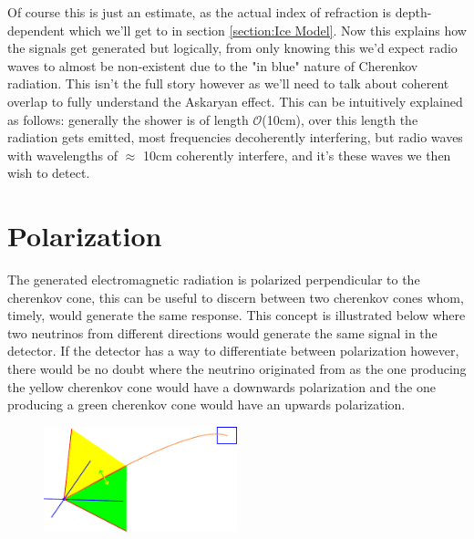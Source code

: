 \documentclass[11pt,a4paper,faculty=we,language=en,doctype=report]{cls/ugent-doc}
\begin{document}
Of course this is just an estimate, as the actual index of refraction is depth-dependent which
we'll get to in section \ref{section:Ice Model}.
Now this explains how the signals get generated but logically, from only knowing this
we'd expect radio waves to almost be non-existent 
due to the "in blue" nature of Cherenkov radiation. 
This isn't the full story however as we'll need to talk about coherent overlap
to fully understand the Askaryan effect. This can be intuitively explained as
follows: generally the shower is of length
$\mathcal{O}$(10cm)\cite{Huege_2017}, over this length the radiation gets
emitted, most frequencies decoherently interfering, but radio waves with wavelengths of 
$\approx$ 10cm coherently interfere, and it's these waves we then wish to detect.
\section{Polarization}
The generated electromagnetic radiation is polarized perpendicular to the
cherenkov cone, this can be useful to discern between two cherenkov cones whom,
timely, would generate the same response. This concept is illustrated below where
two neutrinos from different directions would generate the same signal in the detector.
If the detector has a way to differentiate between polarization however, there would be no
doubt where the neutrino originated from as the one producing the yellow cherenkov cone
would have a downwards polarization and the one producing a green cherenkov cone would have
an upwards polarization.
\begin{figure}[h!]
	\centering
	\includegraphics[width=0.5\textwidth]{illu_polarization.pdf}
\end{figure}
\end{document}
